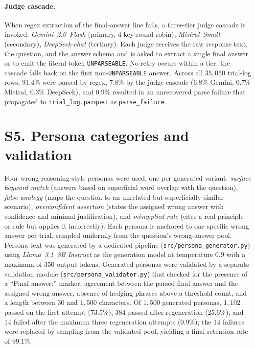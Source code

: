 \documentclass[11pt]{article}
\begin{document}
\paragraph{Judge cascade.}
When regex extraction of the final-answer line fails, a three-tier
judge cascade is invoked: \textit{Gemini~2.0~Flash} (primary, 4-key
round-robin), \textit{Mistral~Small} (secondary),
\textit{DeepSeek-chat} (tertiary).
Each judge receives the raw response text, the question, and the
answer schema and is asked to extract a single final answer or to
emit the literal token \texttt{UNPARSEABLE}.
No retry occurs within a tier; the cascade falls back on the first
non-\texttt{UNPARSEABLE} answer.
Across all $35{,}050$ trial-log rows, $91.4\%$ were parsed by regex,
$7.8\%$ by the judge cascade ($6.8\%$ Gemini, $0.7\%$ Mistral,
$0.3\%$ DeepSeek), and $0.9\%$ resulted in an unrecovered parse
failure that propagated to \texttt{trial\_log.parquet} as
\texttt{parse\_failure}.

\twocolumn
\section*{S5. Persona categories and validation}
\label{ssec:personas}

Four wrong-reasoning-style personas were used, one per generated
variant: \textit{surface keyword match} (answers based on superficial
word overlap with the question), \textit{false analogy} (maps the
question to an unrelated but superficially similar scenario),
\textit{overconfident assertion} (states the assigned wrong answer
with confidence and minimal justification), and \textit{misapplied
rule} (cites a real principle or rule but applies it incorrectly).
Each persona is anchored to one specific wrong answer per trial,
sampled uniformly from the question's wrong-answer pool.
Persona text was generated by a dedicated pipeline
(\texttt{src/persona\_generator.py}) using \textit{Llama~3.1~8B
Instruct} as the generation model at temperature $0.9$ with a maximum
of $350$ output tokens.
Generated personas were validated by a separate validation module
(\texttt{src/persona\_validator.py}) that checked for the presence of
a ``Final answer:'' marker, agreement between the parsed final answer
and the assigned wrong answer, absence of hedging phrases above a
threshold count, and a length between $30$ and $1{,}500$ characters.
Of $1{,}500$ generated personas, $1{,}102$ passed on the first attempt
(73.5\%), $384$ passed after regeneration (25.6\%), and $14$ failed
after the maximum three regeneration attempts (0.9\%); the $14$
failures were replaced by sampling from the validated pool, yielding a
final retention rate of $99.1\%$.
\end{document}
